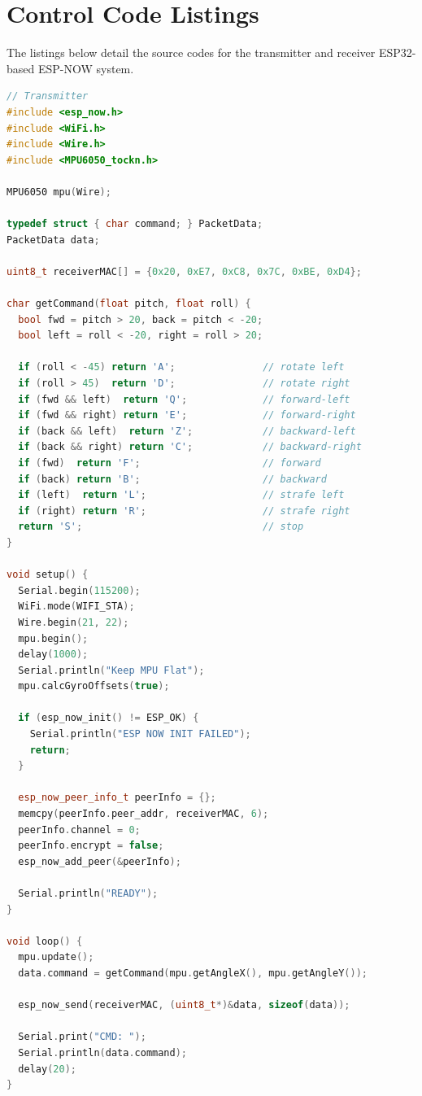 \documentclass[12pt,a4paper,oneside]{report}
\begin{document}
\section{Control Code Listings}
The listings below detail the source codes for the transmitter and receiver ESP32-based ESP-NOW system.
\begin{lstlisting}[language=C++, caption={ESP32 Transmitter Code (ESP-NOW with MPU6050 Pitch/Roll mapping)}]
// Transmitter
#include <esp_now.h>
#include <WiFi.h>
#include <Wire.h>
#include <MPU6050_tockn.h>

MPU6050 mpu(Wire);

typedef struct { char command; } PacketData;
PacketData data;

uint8_t receiverMAC[] = {0x20, 0xE7, 0xC8, 0x7C, 0xBE, 0xD4};

char getCommand(float pitch, float roll) {
  bool fwd = pitch > 20, back = pitch < -20;
  bool left = roll < -20, right = roll > 20;

  if (roll < -45) return 'A';               // rotate left
  if (roll > 45)  return 'D';               // rotate right
  if (fwd && left)  return 'Q';             // forward-left
  if (fwd && right) return 'E';             // forward-right
  if (back && left)  return 'Z';            // backward-left
  if (back && right) return 'C';            // backward-right
  if (fwd)  return 'F';                     // forward
  if (back) return 'B';                     // backward
  if (left)  return 'L';                    // strafe left
  if (right) return 'R';                    // strafe right
  return 'S';                               // stop
}

void setup() {
  Serial.begin(115200);
  WiFi.mode(WIFI_STA);
  Wire.begin(21, 22);
  mpu.begin();
  delay(1000);
  Serial.println("Keep MPU Flat");
  mpu.calcGyroOffsets(true);

  if (esp_now_init() != ESP_OK) {
    Serial.println("ESP NOW INIT FAILED");
    return;
  }

  esp_now_peer_info_t peerInfo = {};
  memcpy(peerInfo.peer_addr, receiverMAC, 6);
  peerInfo.channel = 0;
  peerInfo.encrypt = false;
  esp_now_add_peer(&peerInfo);

  Serial.println("READY");
}

void loop() {
  mpu.update();
  data.command = getCommand(mpu.getAngleX(), mpu.getAngleY());

  esp_now_send(receiverMAC, (uint8_t*)&data, sizeof(data));

  Serial.print("CMD: ");
  Serial.println(data.command);
  delay(20);
}
\end{lstlisting}
\end{document}
